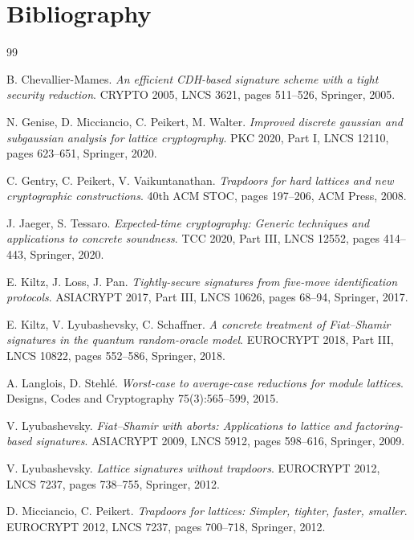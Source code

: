 \documentclass{aicr-conjecture}
\begin{document}
\section{Bibliography}

\begin{aicrbibliography}{99}

B. Chevallier-Mames.
\emph{An efficient CDH-based signature scheme with a tight security
reduction}.
CRYPTO 2005, LNCS 3621, pages 511--526, Springer, 2005.

N. Genise, D. Micciancio, C. Peikert, M. Walter.
\emph{Improved discrete gaussian and subgaussian analysis for lattice
cryptography}.
PKC 2020, Part I, LNCS 12110, pages 623--651, Springer, 2020.

C. Gentry, C. Peikert, V. Vaikuntanathan.
\emph{Trapdoors for hard lattices and new cryptographic constructions}.
40th ACM STOC, pages 197--206, ACM Press, 2008.

J. Jaeger, S. Tessaro.
\emph{Expected-time cryptography: Generic techniques and applications
to concrete soundness}.
TCC 2020, Part III, LNCS 12552, pages 414--443, Springer, 2020.

E. Kiltz, J. Loss, J. Pan.
\emph{Tightly-secure signatures from five-move identification
protocols}.
ASIACRYPT 2017, Part III, LNCS 10626, pages 68--94, Springer, 2017.

E. Kiltz, V. Lyubashevsky, C. Schaffner.
\emph{A concrete treatment of Fiat--Shamir signatures in the quantum
random-oracle model}.
EUROCRYPT 2018, Part III, LNCS 10822, pages 552--586, Springer, 2018.

A. Langlois, D. Stehl\'e.
\emph{Worst-case to average-case reductions for module lattices}.
Designs, Codes and Cryptography 75(3):565--599, 2015.

V. Lyubashevsky.
\emph{Fiat--Shamir with aborts: Applications to lattice and
factoring-based signatures}.
ASIACRYPT 2009, LNCS 5912, pages 598--616, Springer, 2009.

V. Lyubashevsky.
\emph{Lattice signatures without trapdoors}.
EUROCRYPT 2012, LNCS 7237, pages 738--755, Springer, 2012.

D. Micciancio, C. Peikert.
\emph{Trapdoors for lattices: Simpler, tighter, faster, smaller}.
EUROCRYPT 2012, LNCS 7237, pages 700--718, Springer, 2012.

\end{aicrbibliography}
\end{document}
